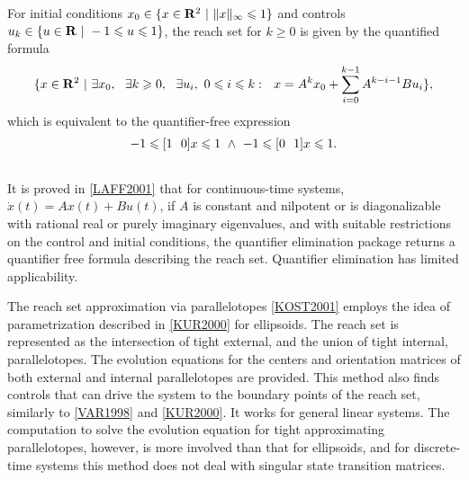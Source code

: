 \documentclass[letterpaper,10pt,english]{sphinxmanual}
\begin{document}
For initial conditions $x_0\in\{x\in {\bf R}^2 ~|~ \|x\|_{\infty} \leqslant1\}$ and
controls $u_k\in\{u\in {\bf R} ~|~ -1\leqslant u\leqslant1\}$, the
reach set for $k\geqslant0$ is given by the quantified formula
\begin{gather}
\begin{split}\{ x\in{\bf R}^2 ~|~ \exists x_0, ~~ \exists k\geqslant0, ~~
\exists u_i, ~ 0\leqslant i\leqslant k: ~~
x = A^kx_0+\sum_{i=0}^{k-1}A^{k-i-1}Bu_i \},\end{split}\notag
\end{gather}
which is equivalent to the quantifier-free expression
\begin{gather}
\begin{split}-1\leqslant[1 ~~ 0]x\leqslant1 ~ \wedge ~ -1\leqslant[0 ~~ 1]x\leqslant1.\end{split}\notag\\\begin{split}\end{split}\notag
\end{gather}
It is proved in {\hyperref[chap_intro:laff2001]{{[}LAFF2001{]}}} that for
continuous-time systems, $\dot{x}(t) = Ax(t) + Bu(t)$, if
$A$ is constant and nilpotent or is diagonalizable with rational
real or purely imaginary eigenvalues, and with suitable restrictions on
the control and initial conditions, the quantifier elimination package
returns a quantifier free formula describing the reach set. Quantifier
elimination has limited applicability.

The reach set approximation via parallelotopes {\hyperref[chap_intro:kost2001]{{[}KOST2001{]}}} employs
the idea of parametrization described in {\hyperref[chap_intro:kur2000]{{[}KUR2000{]}}}
for ellipsoids. The reach set is represented as the intersection of
tight external, and the union of tight internal, parallelotopes. The
evolution equations for the centers and orientation matrices of both
external and internal parallelotopes are provided. This method also
finds controls that can drive the system to the boundary points of the
reach set, similarly to {\hyperref[chap_intro:var1998]{{[}VAR1998{]}}} and {\hyperref[chap_intro:kur2000]{{[}KUR2000{]}}}.
It works for general linear systems. The computation to solve
the evolution equation for tight approximating parallelotopes, however,
is more involved than that for ellipsoids, and for discrete-time systems
this method does not deal with singular state transition matrices.
\end{document}
